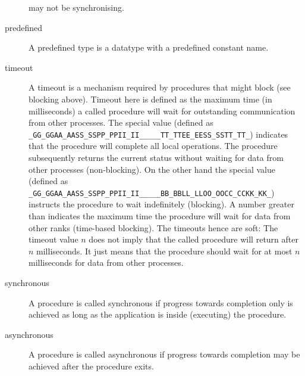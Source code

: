 \documentclass[a4paper]{article}
\makeatletter
\newlength{\st}\setlength{\st}{0pt}
\newcommand{\zerowsep}{\hskip 0pt plus 0.1pt minus 0.1pt}
\newcommand{\ZSEP}[1]{\ifx#1\@@@EOZ@@@\let\next\relax\else\ifx#1\_#1\zerowsep\else#1\fi\let\next\ZSEP\fi\next}
\newcommand{\zsep}[1]{\ZSEP{}#1\@@@EOZ@@@}
\newcommand{\GASPITEST}{{\tt\protect\zsep{GASPI\_TEST}}}
\newcommand{\GASPIBLOCK}{{\tt\protect\zsep{GASPI\_BLOCK}}}
\makeatother
\begin{document}
\begin{description}
  may not be synchronising.
\item[predefined] A predefined type is a datatype with a predefined
  constant name.
\item[timeout] A timeout is a mechanism required by procedures that
  might block (see blocking above). Timeout here is defined as the
  maximum time (in milliseconds) a called procedure will wait for
  outstanding communication from other processes. The special value
   (defined as \GASPITEST{}) indicates that the procedure
  will complete all local operations. The procedure subsequently
  returns the current status without waiting for data from other
  processes (non-blocking). On the other hand the special value
   (defined as \GASPIBLOCK{}) instructs the procedure to
  wait indefinitely (blocking).  A number greater than 
  indicates the maximum time the procedure will wait for data from
  other ranks (time-based blocking).  The timeouts hence are soft: The
  timeout value $n$ does not imply that the called procedure will
  return after $n$ milliseconds. It just means that the procedure
  should wait for at most $n$ milliseconds for data from other
  processes.
\item[synchronous] A procedure is called synchronous if progress
  towards completion only is achieved as long as the application is
  inside (executing) the procedure.
\begin{center}
\end{center}
\item[asynchronous]
  A procedure is called asynchronous if progress towards
  completion may be achieved after the procedure exits.
\begin{center}
\end{center}

\end{description}
\end{document}
